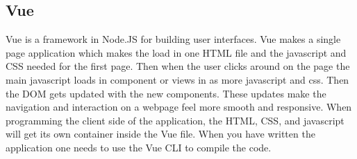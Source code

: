 \subsection{Vue}
Vue\cite{VUE} is a framework in Node.JS for building user interfaces. Vue makes a single page application which makes the load in one HTML file and the javascript and CSS needed for the first page. Then when the user clicks around on the page the main javascript loads in component or views in as more javascript and css. Then the DOM gets updated with the new components. These updates make the navigation and interaction on a webpage feel more smooth and responsive. When programming the client side of the application, the HTML, CSS, and javascript will get its own container inside the Vue file. When you have written the application one needs to use the Vue CLI to compile the code.






